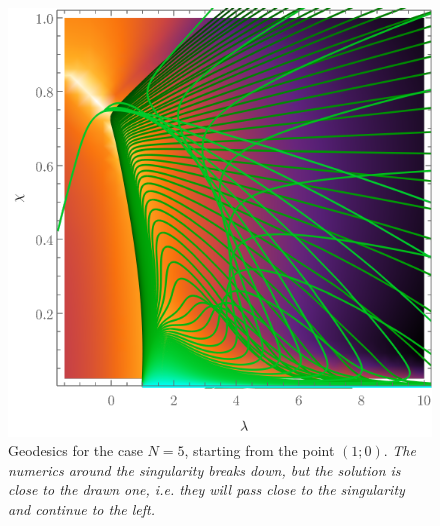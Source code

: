 \begin{figure}[H]
    \centering
    \includegraphics[scale=1.3]{../img/N=5_geods00.pdf}
    \caption{Geodesics for the case $N=5$, starting from the point $(1;0)$. \emph{The numerics around the singularity breaks down, but the solution is close to the drawn one, i.e. they will pass close to the singularity and continue to the left.}}
    \label{fig:geod10}    
\end{figure}

